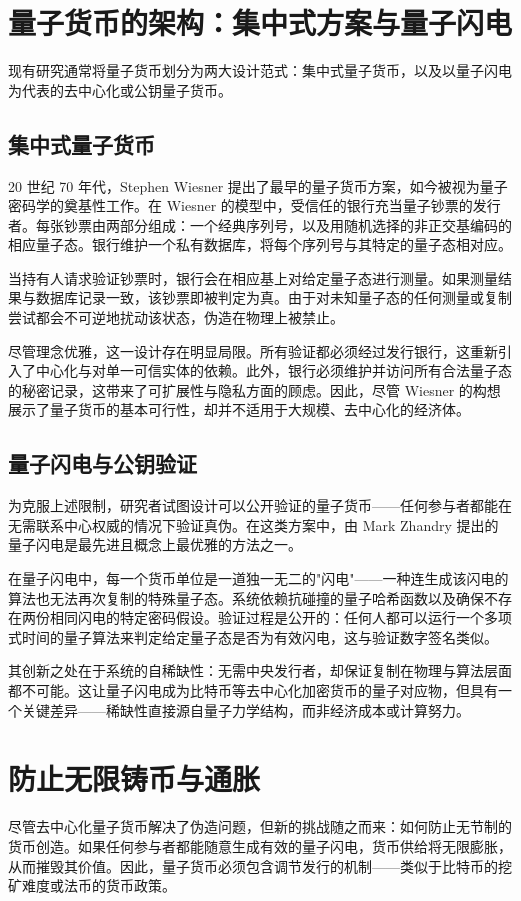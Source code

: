\documentclass[a4paper,10.5pt,twoside]{article}
\begin{document}
\section{量子货币的架构：集中式方案与量子闪电}\label{s:2}
现有研究通常将量子货币划分为两大设计范式：集中式量子货币，以及以量子闪电为代表的去中心化或公钥量子货币。

\subsection{集中式量子货币}\label{s:2.1}
20 世纪 70 年代，Stephen Wiesner 提出了最早的量子货币方案，\autocite{Wiesner_1983}如今被视为量子密码学的奠基性工作。在 Wiesner 的模型中，受信任的银行充当量子钞票的发行者。每张钞票由两部分组成：一个经典序列号，以及用随机选择的非正交基编码的相应量子态。银行维护一个私有数据库，将每个序列号与其特定的量子态相对应。

当持有人请求验证钞票时，银行会在相应基上对给定量子态进行测量。如果测量结果与数据库记录一致，该钞票即被判定为真。由于对未知量子态的任何测量或复制尝试都会不可逆地扰动该状态，伪造在物理上被禁止。

尽管理念优雅，这一设计存在明显局限。所有验证都必须经过发行银行，这重新引入了中心化与对单一可信实体的依赖。此外，银行必须维护并访问所有合法量子态的秘密记录，这带来了可扩展性与隐私方面的顾虑。因此，尽管 Wiesner 的构想展示了量子货币的基本可行性，却并不适用于大规模、去中心化的经济体。

\subsection{量子闪电与公钥验证}\label{s:2.2}
为克服上述限制，研究者试图设计可以公开验证的量子货币——任何参与者都能在无需联系中心权威的情况下验证真伪。在这类方案中，由 Mark Zhandry 提出的量子闪电\autocite{Zhandry_2021}是最先进且概念上最优雅的方法之一。

在量子闪电中，每一个货币单位是一道独一无二的"闪电"——一种连生成该闪电的算法也无法再次复制的特殊量子态。系统依赖抗碰撞的量子哈希函数以及确保不存在两份相同闪电的特定密码假设。验证过程是公开的：任何人都可以运行一个多项式时间的量子算法来判定给定量子态是否为有效闪电，这与验证数字签名类似。

其创新之处在于系统的自稀缺性：无需中央发行者，却保证复制在物理与算法层面都不可能。这让量子闪电成为比特币等去中心化加密货币的量子对应物，但具有一个关键差异——稀缺性直接源自量子力学结构，而非经济成本或计算努力。

\section{防止无限铸币与通胀}\label{s:3}
尽管去中心化量子货币解决了伪造问题，但新的挑战随之而来：如何防止无节制的货币创造。如果任何参与者都能随意生成有效的量子闪电，货币供给将无限膨胀，从而摧毁其价值。因此，量子货币必须包含调节发行的机制——类似于比特币的挖矿难度或法币的货币政策。
\end{document}
